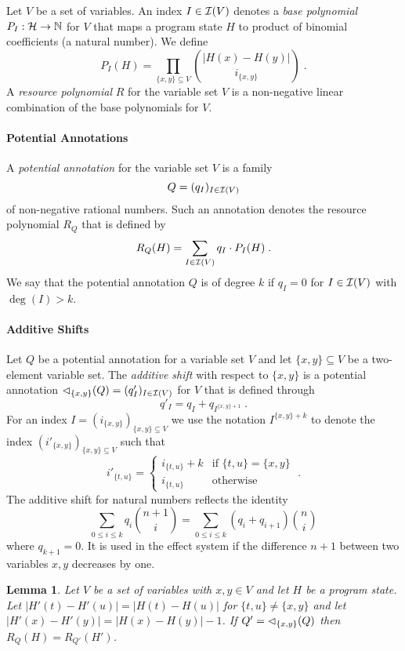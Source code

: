\documentclass[nocopyrightspace,preprint]{sigplanconf}
\newtheorem{lemma}{Lemma}
\begin{document}
Let $V$ be a set of variables.  An index $I \in \mathcal{I}(V)$ denotes a
\emph{base polynomial} $P_I : \mathcal{H} \to \mathbb{N}$ for $V$ that maps a
program state $H$ to product of binomial coefficients (a natural
number).  We define
$$
P_I(H) = \prod_{{\{x,y\}} \subseteq V} \binom {|H(x){-}H(y)|} {i_{\{x,y\}}} \; .
$$
%
A \emph{resource polynomial} $R$ for the variable set $V$ is a
non-negative linear combination of the base polynomials for $V$.

\paragraph{Potential Annotations}

A \emph{potential annotation} for the variable set $V$ is a family
$$Q = (q_I)_{I \in \mathcal{I}(V)}$$ 
of non-negative rational numbers.  Such an annotation denotes the
resource polynomial $R_Q$ that is defined by
$$
R_Q(H) = \sum_{I \in \mathcal{I}(V)} q_I \cdot P_I(H) \; .
$$
%
We say that the potential annotation $Q$ is of degree $k$ if $q_I = 0$
for $I \in \mathcal{I}(V)$ with $\deg(I) > k$.

\paragraph{Additive Shifts}

Let $Q$ be a potential annotation for a variable set $V$ and let
$\{x,y\} \subseteq V$ be a two-element variable set.  The
\emph{additive shift} with respect to $\{x,y\}$ is a potential
annotation ${\lhd}_{\{x,y\}}(Q) = (q'_I)_{I \in \mathcal{I}(V)} $ for $V$
that is defined through
$$
q'_I = q_I + q_{I^{\{x,y\}{+}1}} \; .
$$
For an index $I = (i_{\{x,y\}})_{\{x,y\} \subseteq V}$ we use the
notation $I^{\{x,y\}{+}k}$ to denote the index
$(i'_{\{x,y\}})_{\{x,y\} \subseteq V}$ such that
$$
i'_{\{t,u\}} = \left\{
  \begin{array}{ll}
    i_{\{t,u\}} + k  & \text{if } \{t,u\} = \{x,y\} \\
    i_{\{t,u\}} & \text{otherwise}
  \end{array}
\right.
\;.
$$
%
The additive shift for natural numbers reflects the identity 
\begin{equation}
\label{eq:shift}
\sum_{0 {\leq} i \leq {k}} q_i \binom{n+1}{i} = \sum_{0 {\leq} i \leq {k}} (q_i{+}q_{i+1}) \binom{n}{i}
\end{equation}
where $q_{k+1} = 0$.  It is used in the effect system if the
difference $n+1$ between two variables $x,y$ decreases by one.

\begin{lemma} Let $V$ be a set of variables with $x,y \in V$ and let
  $H$ be a program state. Let $|H'(t) {-} H'(u)| = |H(t) {-} H(u)|$
  for $\{t,u\} \neq \{x,y\}$ and let $|H'(x) {-} H'(y)| = |H(x) {-}
  H(y)| - 1$.
  If $Q' = {\lhd}_{\{x,y\}}(Q)$ then $R_Q(H) = R_{Q'}(H')$.
\end{lemma}
\end{document}
